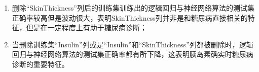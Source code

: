 \documentclass[a4paper]{ctexart}
\begin{document}
\begin{enumerate}
\begin{enumerate}[label=\alph*)]
		      \item 删除“SkinThickness”列后的训练集训练出的逻辑回归与神经网络算法的测试集正确率较高但是波动很大，表明SkinThickness列并非是和糖尿病直接相关的特征，但是在一定程度上有助于糖尿病诊断；
		      \item 当删除训练集“Insulin”列或是“Insulin”和“SkinThickness”列都被删除时，逻辑回归与神经网络算法的测试集正确率都有所下降，这表明胰岛素确实时糖尿病诊断的重要特征。
	      \end{enumerate}
\end{enumerate}


\end{document}
